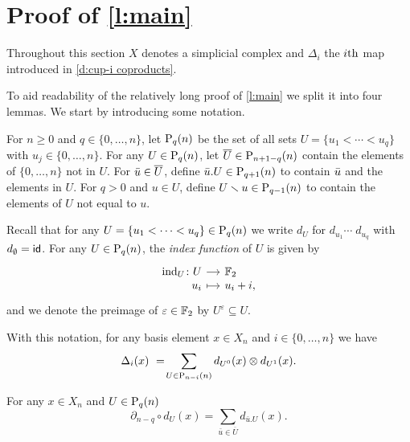 
\section{Proof of \texorpdfstring{\cref{l:main}}{main lemma}} \label{s:proof}

Throughout this section $X$ denotes a simplicial complex and $\Delta_i$ the $i\th$ map introduced in \cref{d:cup-i coproducts}.

To aid readability of the relatively long proof of \cref{l:main} we split it into four lemmas.
We start by introducing some notation.

\begin{definition}
	For $n \geq0$ and $q \in \{0, \dots, n\}$, let $\P_q(n)$ be the set of all sets $U = \{u_1 < \cdots < u_q\}$ with $u_j \in \{0, \dots, n\}$.
	For any $U \in \P_q(n)$, let $\overline{U} \in \P_{n+1-q}(n)$ contain the elements of $\{0, \dots, n\}$ not in $U$. For $\bu \in \overline{U}$, define $\bu.U \in \P_{q+1}(n)$ to contain $\bu$ and the elements in $U$.
	For $q > 0$ and $u \in U$, define $U \sm u \in \P_{q-1}(n)$ to contain the elements of $U$ not equal to $u$.
\end{definition}

Recall that for any $U = \{u_1 < \cdots < u_q\} \in \P_q(n)$ we write $d_U$ for $d_{u_1} \cdots \; d_{u_q}$ with $d_{\emptyset} = \id$.
For any $U \in \P_q(n)$, the \textit{index function} of $U$ is given by
\begin{equation*}
\begin{tikzcd}[row sep=-3pt, column sep=small,
/tikz/column 1/.append style={anchor=base east},
/tikz/column 2/.append style={anchor=base west}]
\ind_U \colon U \arrow[r] & \Ftwo \\
u_i \arrow[r, mapsto] & u_i + i,
\end{tikzcd}
\end{equation*}
and we denote the preimage of $\varepsilon \in \Ftwo$ by $U^\varepsilon \subseteq U$.

With this notation, for any basis element $x \in X_n$ and $i \in \{0, \dots, n\}$ we have
\begin{equation*}
\Delta_{i}(x)\ =\! \sum_{U \in \P_{n-i}(n)} d_{U^0}(x) \otimes d_{U^1}(x).
\end{equation*}

\begin{lemma} \label{l:partial dU = dxU}
	For any $x \in X_n$ and $U \in \P_{q}(n)$
	\begin{equation} \label{lemma1: existence:eq1}
	\partial_{n-q} \circ d_U(x) = \sum_{\bar{u} \in \overline{U}} d_{\bar{u}.U}(x).
	\end{equation}
\end{lemma}

